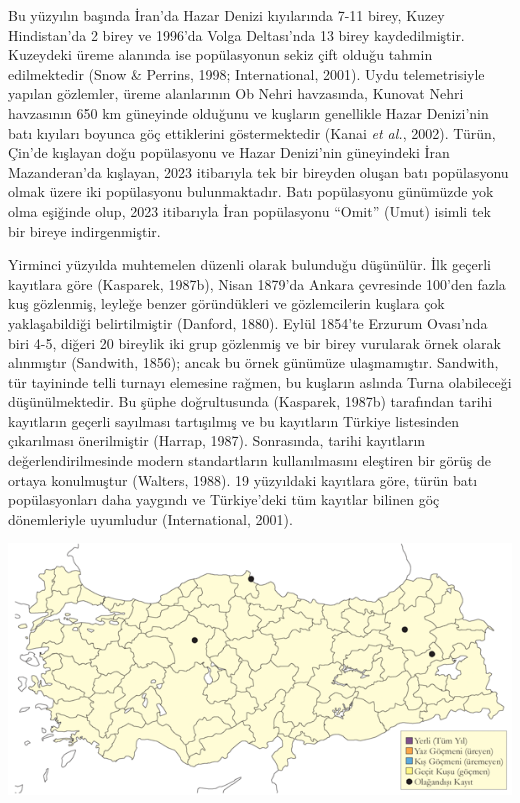 \documentclass[
  a4paper,
  DIV=11,
  numbers=noendperiod]{scrreprt}
\begin{document}
Bu yüzyılın başında İran'da Hazar Denizi kıyılarında 7-11 birey, Kuzey
Hindistan'da 2 birey ve 1996'da Volga Deltası'nda 13 birey
kaydedilmiştir. Kuzeydeki üreme alanında ise popülasyonun sekiz çift
olduğu tahmin edilmektedir (Snow \& Perrins, 1998; International, 2001).
Uydu telemetrisiyle yapılan gözlemler, üreme alanlarının Ob Nehri
havzasında, Kunovat Nehri havzasının 650 km güneyinde olduğunu ve
kuşların genellikle Hazar Denizi'nin batı kıyıları boyunca göç
ettiklerini göstermektedir (Kanai \emph{et al.}, 2002). Türün, Çin'de
kışlayan doğu popülasyonu ve Hazar Denizi'nin güneyindeki İran
Mazanderan'da kışlayan, 2023 itibarıyla tek bir bireyden oluşan batı
popülasyonu olmak üzere iki popülasyonu bulunmaktadır. Batı popülasyonu
günümüzde yok olma eşiğinde olup, 2023 itibarıyla İran popülasyonu
``Omit'' (Umut) isimli tek bir bireye indirgenmiştir.

Yirminci yüzyılda muhtemelen düzenli olarak bulunduğu düşünülür. İlk
geçerli kayıtlara göre (Kasparek, 1987b), Nisan 1879'da Ankara
çevresinde 100'den fazla kuş gözlenmiş, leyleğe benzer göründükleri ve
gözlemcilerin kuşlara çok yaklaşabildiği belirtilmiştir (Danford, 1880).
Eylül 1854'te Erzurum Ovası'nda biri 4-5, diğeri 20 bireylik iki grup
gözlenmiş ve bir birey vurularak örnek olarak alınmıştır (Sandwith,
1856); ancak bu örnek günümüze ulaşmamıştır. Sandwith, tür tayininde
telli turnayı elemesine rağmen, bu kuşların aslında Turna olabileceği
düşünülmektedir. Bu şüphe doğrultusunda (Kasparek, 1987b) tarafından
tarihi kayıtların geçerli sayılması tartışılmış ve bu kayıtların Türkiye
listesinden çıkarılması önerilmiştir (Harrap, 1987). Sonrasında, tarihi
kayıtların değerlendirilmesinde modern standartların kullanılmasını
eleştiren bir görüş de ortaya konulmuştur (Walters, 1988). 19 yüzyıldaki
kayıtlara göre, türün batı popülasyonları daha yaygındı ve Türkiye'deki
tüm kayıtlar bilinen göç dönemleriyle uyumludur (International, 2001).

\includegraphics{images/harita_Page_124.png}
\end{document}
